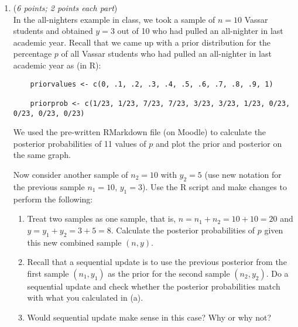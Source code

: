 \documentclass[11pt]{article}
\begin{document}
\begin{enumerate}
   \item ({\it{6 points; 2 points each part}})\\
    In the all-nighters example in class, we took a sample of $n = 10$ Vassar students and obtained $y = 3$ out of 10 who had pulled an all-nighter in last academic year. Recall that we came up with a prior distribution for the percentage $p$ of all Vassar students who had pulled an all-nighter in last academic year as (in R):
    
    \begin{verbatim}
    priorvalues <- c(0, .1, .2, .3, .4, .5, .6, .7, .8, .9, 1)
    
    priorprob <- c(1/23, 1/23, 7/23, 7/23, 3/23, 3/23, 1/23, 0/23, 0/23, 0/23, 0/23)
    \end{verbatim}
    
    We used the pre-written RMarkdown file (on Moodle) to calculate the posterior probabilities of 11 values of $p$ and plot the prior and posterior on the same graph.
    
    Now consider another sample of $n_2 = 10$ with $y_2 = 5$ (use new notation for the previous sample $n_1 = 10$, $y_1 = 3$). Use the R script and make changes to perform the following:
    
    \begin{enumerate}
    \item Treat two samples as one sample, that is, $n = n_1 + n_2 = 10 + 10 = 20$ and $y = y_1 + y_2 = 3 + 5 = 8$. Calculate the posterior probabilities of $p$ given this new combined sample $(n, y)$.
    
    \item Recall that a sequential update is to use the previous posterior from the first sample $(n_1, y_1)$ as the prior for the second sample $(n_2, y_2)$. Do a sequential update and check whether the posterior probabilities match with what you calculated in (a). 
    
    \item Would sequential update make sense in this case? Why or why not?
    \end{enumerate}
    
    
    
\end{enumerate}
\end{document}
